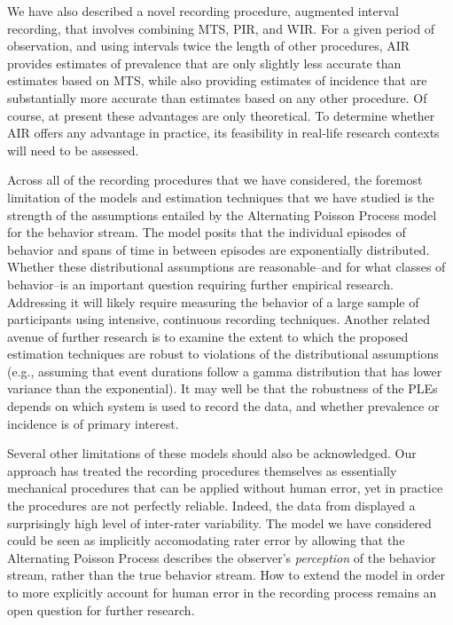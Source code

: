 \documentclass[man, noextraspace, floatsintext]{apa6}\usepackage[]{graphicx}\usepackage[]{color}
\begin{document}
We have also described a novel recording procedure, augmented interval recording, that involves combining MTS, PIR, and WIR. For a given period of observation, and using intervals twice the length of other procedures, AIR provides estimates of prevalence that are only slightly less accurate than estimates based on MTS, while also providing estimates of incidence that are substantially more accurate than estimates based on any other procedure. Of course, at present these advantages are only theoretical. To determine whether AIR offers any advantage in practice, its feasibility in real-life research contexts will need to be assessed.  

Across all of the recording procedures that we have considered, the foremost limitation of the models and estimation techniques that we have studied is the strength of the assumptions entailed by the Alternating Poisson Process model for the behavior stream. The model posits that the individual episodes of behavior and spans of time in between episodes are exponentially distributed. Whether these distributional assumptions are reasonable--and for what classes of behavior--is an important question requiring further empirical research. Addressing it will likely require measuring the behavior of a large sample of participants using intensive, continuous recording techniques. 
Another related avenue of further research is to examine the extent to which the proposed estimation techniques are robust to violations of the distributional assumptions (e.g., assuming that event durations follow a gamma distribution that has lower variance than the exponential). It may well be that the robustness of the PLEs depends on which system is used to record the data, and whether prevalence or incidence is of primary interest.

Several other limitations of these models should also be acknowledged. Our approach has treated the recording procedures themselves as essentially mechanical procedures that can be applied without human error, yet in practice the procedures are not perfectly reliable. Indeed, the data from \citet{Johnson2014reliability} displayed a surprisingly high level of inter-rater variability. The model we have considered could be seen as implicitly accomodating rater error by allowing that the Alternating Poisson Process describes the observer's \textit{perception} of the behavior stream, rather than the true behavior stream. How to extend the model in order to more explicitly account for human error in the recording process remains an open question for further research.
\end{document}

